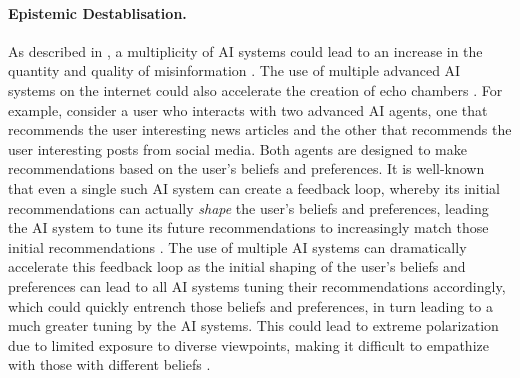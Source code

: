\paragraph{Epistemic Destablisation.}
As described in , a multiplicity of AI systems could lead to an increase in the quantity and quality of misinformation \citep{Kay2024,zhou2023synthetic}.
The use of multiple advanced AI systems on the internet could also accelerate the creation of echo chambers \citep{piao2025emergencehumanlikepolarizationlarge,Csernatoni2024,Kreps2023}.
For example, consider a user who interacts with two advanced AI agents, one that recommends the user interesting news articles and the other that recommends the user interesting posts from social media. Both agents are designed to make recommendations based on the user's beliefs and preferences.
It is well-known that even a single such AI system can create a feedback loop, whereby its initial recommendations can actually \emph{shape} the user's beliefs and preferences, leading the AI system to tune its future recommendations to increasingly match those initial recommendations \citep{jiang2019degenerate,ge2020understanding}.
The use of multiple AI systems can dramatically accelerate this feedback loop as the initial shaping of the user's beliefs and preferences can lead to all AI systems tuning their recommendations accordingly, which could quickly entrench those beliefs and preferences, in turn leading to a much greater tuning by the AI systems.
This could lead to extreme polarization due to limited exposure to diverse viewpoints, making it difficult to empathize with those with different beliefs \citep{cinelli2021echo}. 


